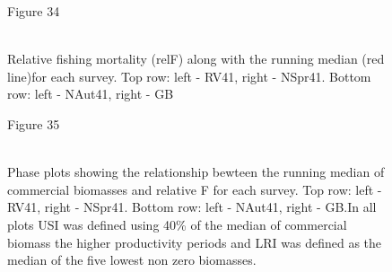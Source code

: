 \documentclass[11pt]{article}
\newcommand{\e}{/backup/bio_data/bio.lobster/figures/} %
\begin{document}
\begin{figure}
\centering
        {Figure 34}\\
       \\

       \caption{Relative fishing mortality (relF) along with the running median (red line)for each survey. Top row: left - RV41, right - NSpr41. Bottom row: left - NAut41, right - GB }
\end{figure}
     \clearpage


\begin{landscape}
\begin{figure}
\centering
        {Figure 35}\\
        \\

       
       \caption{Phase plots showing the relationship bewteen the running median of commercial biomasses and relative F for each survey. Top row: left - RV41, right - NSpr41. Bottom row: left - NAut41, right - GB.In all plots USI was defined using 40\% of the median of commercial biomass the higher productivity periods and LRI was defined as the median of the five lowest non zero biomasses. }

\end{figure}
\end{landscape}

\clearpage

\end{document}

